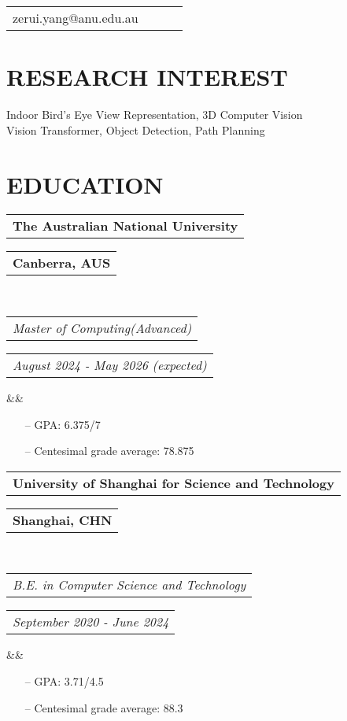 \documentclass[11pt,a4paper,roman]{moderncv}        %
\makeatletter
\newcommand*{\customcventry}[7][.25em]{
	\begin{tabular}{@{}l} 
		{\bfseries #4}
	\end{tabular}
	\hfill%
	\begin{tabular}{l@{}}
		{\bfseries #5}
	\end{tabular} \\
	\begin{tabular}{@{}l} 
		{\itshape #3}
	\end{tabular}
	\hfill%
	\begin{tabular}{l@{}}
		{\itshape #2}
	\end{tabular}
	\ifx&#7&%
	\else{\\%
		\begin{minipage}{\maincolumnwidth}%
			\small#7%
	\end{minipage}}\fi%
	\par\addvspace{#1}}
\makeatother
\begin{document}
	\makecvtitle
	\vspace*{-16mm}
	
	\begin{center}
		\renewcommand{\arraystretch}{1.3}
		\begin{tabular}{ c c c c }
			\faEnvelopeO\enspace zerui.yang@anu.edu.au \enspace  \enspace
		\end{tabular}
	\end{center}
	
	\vspace*{-2.5mm}
	

	\cfoot{\vspace{-2mm}{\color{gray} \rule[-10pt]{14.3cm}{0.05em}} \vspace{2mm}\\ \emph{\textcolor{gray}{Last Updated by: 2025/10/01}}}
	
	\section{RESEARCH INTEREST}
	Indoor Bird's Eye View Representation, 3D Computer Vision \\ 
    Vision Transformer, Object Detection, Path Planning
	
	\section{EDUCATION}
	{\customcventry{August 2024 - May 2026 (expected)}{Master of Computing(Advanced) }{The Australian National University}{Canberra, AUS}{}{}}
	
	\begin{itemize}
		\item[--] GPA: 6.375/7  
		\item[--] Centesimal grade average: 78.875 
	\end{itemize}
	\vspace{2mm}
	
	{\customcventry{September 2020 - June 2024}{B.E. in Computer Science and Technology }{University of Shanghai for Science and Technology}{Shanghai, CHN}{}{}}
	
	\begin{itemize}
		\item[--] GPA: 3.71/4.5 
		\item[--] Centesimal grade average: 88.3 
	\end{itemize}
\end{document}
